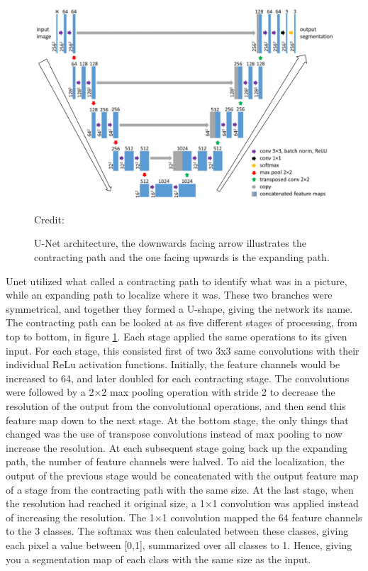     \begin{figure}[H]
        \centering
        \includegraphics[scale=0.5]{figures/unet_arrows.png}
        \caption[U-Net architecture]{U-Net architecture, the downwards facing arrow illustrates the contracting path and the one facing upwards is the expanding path.}
      	\medskip 
        \label{unet_fig}
        \hspace*{15pt}\hbox{\scriptsize Credit: \citeauthor{brautaset2020acoustic}\cite{brautaset2020acoustic}}
    \end{figure}
    
    Unet utilized what \citeauthor{unet_ronneberger2015}\cite{unet_ronneberger2015} called a contracting path to identify what was in a picture, while an expanding path to localize where it was. These two branches were symmetrical, and together they formed a U-shape, giving the network its name. The contracting path can be looked at as five different stages of processing, from top to bottom, in figure \ref{unet_fig}. Each stage applied the same operations to its given input. For each stage, this consisted first of two 3x3 same convolutions with their individual ReLu activation functions. Initially, the feature channels would be increased to 64, and later doubled for each contracting stage. The convolutions were followed by a 2×2 max pooling operation with stride 2 to decrease the resolution of the output from the convolutional operations, and then send this feature map down to the next stage. At the bottom stage, the only things that changed was the use of transpose convolutions instead of max pooling to now increase the resolution. At each subsequent stage going back up the expanding path, the number of feature channels were halved. To aid the localization, the output of the previous stage would be concatenated with the output feature map of a stage from the contracting path with the same size. At the last stage, when the resolution had reached it original size, a 1×1 convolution was applied instead of increasing the resolution. The 1×1 convolution mapped the 64 feature channels to the 3 classes. The softmax was then calculated between these classes, giving each pixel a value between [0,1], summarized over all classes to 1. Hence, giving you a segmentation map of each class with the same size as the input. 
    
